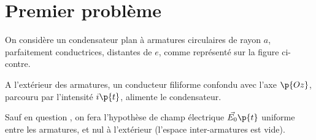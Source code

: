 \documentclass[a4paper,french,bookmarks]{article}
\begin{document}
    \renewcommand{\thesection}{\Roman{section}} 
    \renewcommand{\thesubsection}{\thesection.\Alph{subsection}}
    \renewcommand{\labelenumi}{\thesection.\arabic{enumi}.}
    \renewcommand*{\labelenumii}{\roman{enumii})}
    
    \newcommand{\ON}{\mathbf{ON}}
    
    
    \section{Premier problème}
    
    \begin{minipage}{0.3\linewidth}
    \end{minipage}
    \hfill
    \begin{minipage}{0.6\linewidth}
        On considère un condensateur plan à armatures circulaires de rayon $a$, parfaitement conductrices, distantes de $e$, comme représenté sur la figure ci-contre.\bigskip
        
        A l'extérieur des armatures, un conducteur filiforme confondu avec l'axe $\p{Oz}$, parcouru par l'intensité $i\p{t}$, alimente le condensateur.\newline
        
        Sauf en question , on fera l'hypothèse de champ électrique $\vec{E_0}\p{t}$ uniforme entre les armatures, et nul à l'extérieur (l'espace inter-armatures est vide).
    \end{minipage}
    
\end{document}
